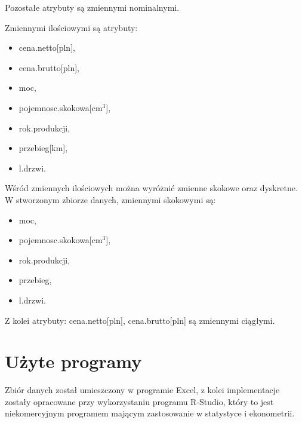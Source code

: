 \documentclass[12pt,a4paper]{report}
\begin{document}
Pozostałe atrybuty są zmiennymi nominalnymi.

Zmiennymi ilościowymi są atrybuty:
\begin{multicols}{3}
\begin{itemize}
 \item cena.netto[pln],%
 \item cena.brutto[pln],%
 \item moc,%
 \item pojemnosc.skokowa[cm$^3$],%
 \item rok.produkcji, %
 \item przebieg[km],%
 \item l.drzwi. %
\end{itemize}
\end{multicols}

Wśród zmiennych ilościowych można wyróżnić zmienne skokowe oraz dyskretne. W stworzonym zbiorze danych, zmiennymi skokowymi są: 
\begin{multicols}{3}
\begin{itemize}
	\item moc, %
	\item pojemnosc.skokowa[cm$^3$], %
	\item rok.produkcji, %
	\item przebieg, %
	\item l.drzwi. %

\end{itemize}
\end{multicols}
Z kolei atrybuty: cena.netto[pln], cena.brutto[pln] są zmiennymi ciągłymi. 

\section{Użyte programy}
Zbiór danych został umieszczony w programie Excel, z kolei implementacje zostały opracowane przy wykorzystaniu programu R-Studio, który to jest niekomercyjnym programem mającym zastosowanie w statystyce i ekonometrii. 












\end{document}
